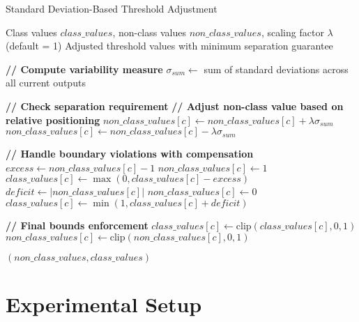 \documentclass[12pt,fleqn,a4paper]{article}
\begin{document}
\begin{algorithm}
\caption{Standard Deviation-Based Threshold Adjustment}
\label{alg:sigma_spacing}
\begin{algorithmic}[1]
\REQUIRE Class values $class\_values$, non-class values $non\_class\_values$, scaling factor $\lambda$ (default = 1)
\ENSURE Adjusted threshold values with minimum separation guarantee

\STATE \textbf{// Compute variability measure}
\STATE $\sigma_{sum} \leftarrow$ sum of standard deviations across all current outputs

    \STATE \textbf{// Check separation requirement}
        \STATE \textbf{// Adjust non-class value based on relative positioning}
            \STATE $non\_class\_values[c] \leftarrow non\_class\_values[c] + \lambda \sigma_{sum}$
        \ELSE
            \STATE $non\_class\_values[c] \leftarrow non\_class\_values[c] - \lambda \sigma_{sum}$
        \ENDIF
        
        \STATE \textbf{// Handle boundary violations with compensation}
            \STATE $excess \leftarrow non\_class\_values[c] - 1$
            \STATE $non\_class\_values[c] \leftarrow 1$
            \STATE $class\_values[c] \leftarrow \max(0, class\_values[c] - excess)$
            \STATE $deficit \leftarrow |non\_class\_values[c]|$
            \STATE $non\_class\_values[c] \leftarrow 0$
            \STATE $class\_values[c] \leftarrow \min(1, class\_values[c] + deficit)$
        \ENDIF
    \ENDIF
    
    \STATE \textbf{// Final bounds enforcement}
    \STATE $class\_values[c] \leftarrow \text{clip}(class\_values[c], 0, 1)$
    \STATE $non\_class\_values[c] \leftarrow \text{clip}(non\_class\_values[c], 0, 1)$
\ENDFOR

\RETURN $(non\_class\_values, class\_values)$
\end{algorithmic}
\end{algorithm}





\section{Experimental Setup}
\end{document}
